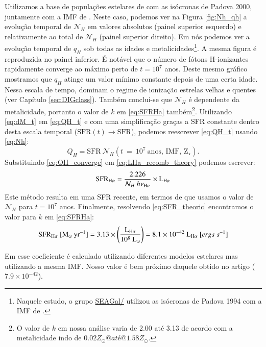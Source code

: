 Utilizamos a base de populações estelares de \citet{Bruzual.Charlot.2003} com as isócronas de Padova 2000, juntamente com a IMF de \citet{Salpeter.1955a}. Neste caso, podemos ver na Figura \ref{fig:Nh_qh} a evolução temporal de $\mathcal{N}_H$ em valores absolutos (painel superior esquerdo) e relativamente ao total de $\mathcal{N}_H$ (painel superior direito). Em \citet[Figura 2b]{CidFernandes.etal.2011a} nós podemos ver a evolução temporal de $q_H$ sob todas as idades e metalicidades\footnote{Naquele estudo, o grupo \href{http://starlight.ufsc.br}{SEAGal/\STARLIGHT} utilizou as isócronas de Padova 1994 com a IMF de \citet{Chabrier.2003a}.}. A mesma figura é reproduzida no painel inferior. É notável que o número de fótons H-ionizantes rapidamente converge ao máximo perto de $t = 10^7$ anos. Deste mesmo gráfico mostramos que $q_H$ atinge um valor mínimo constante depois de uma certa idade. Nessa escala de tempo, dominam o regime de ionização estrelas velhas e quentes (ver Capítulo \ref{sec:DIGclass}). Também conclui-se que $\mathcal{N}_H$ é dependente da metalicidade, portanto o valor de $k$ em \eqref{eq:SFRHa} também\footnote{O valor de $k$ em nossa análise varia de 2.00 até 3.13 de acordo com a metalicidade indo de $0.02 Z_\odot@ até @1.58 Z_\odot$.}. Utilizando \eqref{eq:dM_t} em \eqref{eq:QH_t} e com uma simplificação graças a SFR constante dentro desta escala temporal ($\mathrm{SFR}(t)\rightarrow \mathrm{SFR}$), podemos reescrever \eqref{eq:QH_t} usando \eqref{eq:Nh}:
\begin{equation}
	Q_H = \mathrm{SFR}\ \mathcal{N}_H(t\ =\ 10^7\ \textrm{anos, IMF, Z}{}_\star).
	\label{eq:QH_converge}
\end{equation}
\noindent Substituindo \eqref{eq:QH_converge} em \eqref{eq:LHa_recomb_theory} podemos escrever:
\begin{equation}
	\mathrm{SFR}_{\Ha} = \frac{2.226}{\mathcal{N}_H\ h \nu_{\Ha}} \times \LHalpha
	\label{eq:SFR_theoric}
\end{equation}
\noindent Este método resulta em uma SFR recente, em termos de que usamos o valor de $\mathcal{N}_H$ para $t = 10^7$ anos. Finalmente, resolvendo \eqref{eq:SFR_theoric} encontramos o valor para $k$ em \eqref{eq:SFRHa}:
\begin{equation}
	\mathrm{SFR}_{\Ha}\ [\mathrm{M}_\odot\ \mathrm{yr}^{-1}] = 3.13 \times
	\left(\frac{\LHalpha}{10^8\ \mathrm{L}_\odot}\right) = 8.1 \times 10^{-42}\ \LHalpha\ [ergs\ s^{-1}]
	\label{eq:SFRNeb}
\end{equation}

Em \citet{Kennicutt.1998a} esse coeficiente é calculado utilizando diferentes modelos estelares mas utilizando a mesma IMF. Nosso valor é bem próximo daquele obtido no artigo ($7.9 \times 10^{-42}$).

